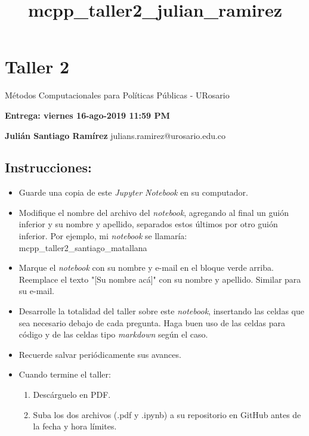 \documentclass[11pt]{article}
\title{mcpp\_taller2\_julian\_ramirez}
\providecommand{\tightlist}{%
      \setlength{\itemsep}{0pt}\setlength{\parskip}{0pt}}
\begin{document}
    
    
    \maketitle
    
    

    
    \section{Taller 2}\label{taller-2}

Métodos Computacionales para Políticas Públicas - URosario

\textbf{Entrega: viernes 16-ago-2019 11:59 PM}

    \textbf{Julián Santiago Ramírez} julians.ramirez@urosario.edu.co

    \subsection{Instrucciones:}\label{instrucciones}

\begin{itemize}
\tightlist
\item
  Guarde una copia de este \emph{Jupyter Notebook} en su computador.
\item
  Modifique el nombre del archivo del \emph{notebook}, agregando al
  final un guión inferior y su nombre y apellido, separados estos
  últimos por otro guión inferior. Por ejemplo, mi \emph{notebook} se
  llamaría: mcpp\_taller2\_santiago\_matallana
\item
  Marque el \emph{notebook} con su nombre y e-mail en el bloque verde
  arriba. Reemplace el texto "{[}Su nombre acá{]}" con su nombre y
  apellido. Similar para su e-mail.
\item
  Desarrolle la totalidad del taller sobre este \emph{notebook},
  insertando las celdas que sea necesario debajo de cada pregunta. Haga
  buen uso de las celdas para código y de las celdas tipo
  \emph{markdown} según el caso.
\item
  Recuerde salvar periódicamente sus avances.
\item
  Cuando termine el taller:

  \begin{enumerate}
  \def\labelenumi{\arabic{enumi}.}
  \tightlist
  \item
    Descárguelo en PDF.
  \item
    Suba los dos archivos (.pdf y .ipynb) a su repositorio en GitHub
    antes de la fecha y hora límites.
  \end{enumerate}
\end{itemize}
\end{document}
